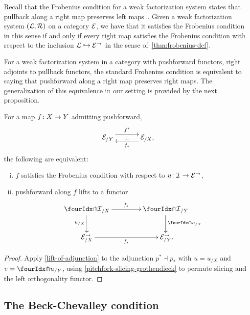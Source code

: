 \documentclass[reqno,10pt,a4paper,oneside,draft]{amsart}
\begin{document}
\begin{remark} Recall that the Frobenius condition for a weak factorization system states that pullback along a right map preserves left maps~\cite{garner:types-omega-groupoids,gambino-garner:idtypewfs}.
Given a weak factorization system $(\cal{L}, \cal{R})$ on a category $\catE$, we have that it satisfies the Frobenius condition in this sense if and only if every right map satisfies the Frobenius condition with respect to the inclusion $\cal{L} \hookrightarrow \catE^\to$ in the sense of~\cref{thm:frobenius-def}.
\end{remark}

For a weak factorization system in a category with pushforward functors, \ie right adjoints to pullback functors, the standard Frobenius condition is equivalent to saying that pushforward along a right map preserves right maps.
The generalization of this equivalence in our setting is provided by the next proposition.

\begin{proposition} \label{lift-pushforward}
For a map $f \co X \to Y$ admitting pushforward,
\[
\xymatrix@C+1em{
  \catE_{/Y}
  \ar@<5pt>[r]^{f^*}
  \ar@{}[r]|{\bot}
&
  \catE_{/X}
  \ar@<5pt>[l]^{f_*}
\rlap{,}}
\]
the following are equivalent:
\begin{enumerate}[(i)]
\item $f$ satisfies the Frobenius condition with respect to $u \co \cal{I} \to \cal{E}^\to$,
\item pushforward along $f$ lifts to a functor
\[
\xymatrix@C=1.5cm{
  {\liftr{\cal{I}}}_{/X}
  \ar[r]^{f_*}
  \ar[d]_{u_{/X}}
&
  {\liftr{\cal{I}}}_{/Y}
  \ar[d]^{{\liftr{u}}_{/Y}}
\\
  \catE_{/X}^\to
  \ar[r]_{f_*}
&
  \catE_{/Y}^\to
\rlap{.}}
\]

\end{enumerate}
\end{proposition}

\begin{proof}
Apply \cref{lift-of-adjunction} to the adjunction $p^* \dashv p_*$ with $u = u_{/X}$ and $v = {\liftr{u}}_{/Y}$, using \cref{pitchfork-slicing-grothendieck} to permute slicing and the left orthogonality functor.
\end{proof}

\subsection*{The Beck-Chevalley condition}
\end{document}
